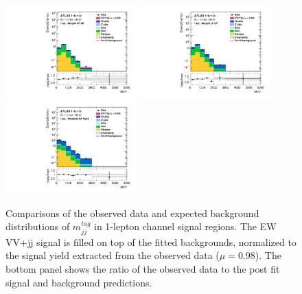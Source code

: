 \begin{figure}[]
    \centering
    \includegraphics[width=0.45\textwidth]{figures/PostFit/Region_distMVV_DSRVBSHP_BMin0_J0_incJet1_L1_T0_incFat1_Y6051_incTag1_Fat1_GlobalFit_unconditionnal_mu1log.pdf}
    \includegraphics[width=0.45\textwidth]{figures/PostFit/Region_distMVV_DSRVBSLP_BMin0_J0_incJet1_L1_T0_incFat1_Y6051_incTag1_Fat1_GlobalFit_unconditionnal_mu1log.pdf}
    \includegraphics[width=0.45\textwidth]{figures/PostFit/Region_distMVV_DSRVBSTight_BMin0_T0_Y6051_incTag1_J2_L1_incJet1_GlobalFit_unconditionnal_mu1log.pdf}
      \caption{Comparisons of the observed data and expected background distributions of $m^{tag}_{jj}$ in 1-lepton channel signal regions. The EW VV+jj signal is filled on top of the fitted backgrounds, normalized to the signal yield extracted from the observed data ($\mu = 0.98$). The bottom panel shows the ratio of the observed data to the post fit signal and background predictions.}
      \label{fig:postSR1lepmvv}
\end{figure}

